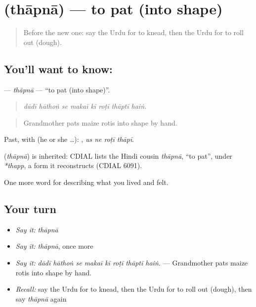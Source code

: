 \section[\texorpdfstring{\ur{تھاپنا} (thāpnā)}{تھاپنا (thāpnā)}]{ (thāpnā) — to pat (into shape)}

\label{lesson:UR-C507-thapna}



\begin{quote}
Before the new one: say the Urdu for to knead, then the Urdu for to roll out (dough).
\end{quote}

\subsection*{You'll want to know: }
\textbf{} — \emph{thāpnā} — \textquotedblleft{}to pat (into shape)\textquotedblright{}.

\begin{quote}
       
\end{quote}

\begin{quote}
\emph{dādī hāthoṅ se makaī kī roṭī thāptī haiṅ.}
\end{quote}

\begin{quote}
Grandmother pats maize rotis into shape by hand.
\end{quote}

Past, with  (he or she …):    , \emph{us ne roṭī thāpī}.

\begin{cousinweb}
\textbf{} (\emph{thāpnā}) is inherited: CDIAL lists the Hindi cousin \emph{thāpnā}, \textquotedblleft{}to pat\textquotedblright{}, under \emph{*thapp}, a form it reconstructs (CDIAL 6091).
\end{cousinweb}

\begin{grammarlens}[title={What you've built}]
One more word for describing what you lived and felt.
\end{grammarlens}

\subsection*{Your turn}
\begin{itemize}
\raggedright
  \item \emph{Say it:} \emph{thāpnā}
  \item \emph{Say it:} \emph{thāpnā}, once more
  \item \emph{Say it:} \emph{dādī hāthoṅ se makaī kī roṭī thāptī haiṅ.} — Grandmother pats maize rotis into shape by hand.
  \item \emph{Recall:} say the Urdu for to knead, then the Urdu for to roll out (dough), then say \emph{thāpnā} again
\end{itemize}

